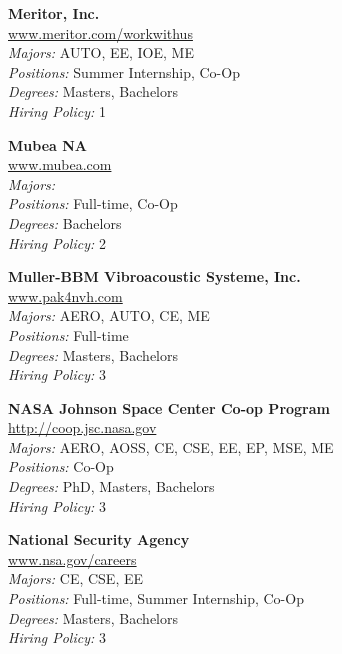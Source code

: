 \documentclass{article}
\begin{document}
\begin{center}
\begin{multicols}{3}
\begin{minipage}{.9\columnwidth}{\Large\bf Meritor, Inc. }\\
	\url{www.meritor.com/workwithus}\\
	\emph{Majors:} AUTO, EE, IOE, ME\\
	\emph{Positions:} Summer Internship, Co-Op\\
	\emph{Degrees:} Masters, Bachelors\\
	\emph{Hiring Policy:} 1\\
\end{minipage}
 
\begin{minipage}{.9\columnwidth}{\Large\bf Mubea NA }\\
	\url{www.mubea.com}\\
	\emph{Majors:} \\
	\emph{Positions:} Full-time, Co-Op\\
	\emph{Degrees:} Bachelors\\
	\emph{Hiring Policy:} 2\\
\end{minipage}
 
\begin{minipage}{.9\columnwidth}{\Large\bf Muller-BBM Vibroacoustic Systeme, Inc. }\\
	\url{www.pak4nvh.com}\\
	\emph{Majors:} AERO, AUTO, CE, ME\\
	\emph{Positions:} Full-time\\
	\emph{Degrees:} Masters, Bachelors\\
	\emph{Hiring Policy:} 3\\
\end{minipage}
 
\begin{minipage}{.9\columnwidth}{\Large\bf NASA Johnson Space Center Co-op Program }\\
	\url{http://coop.jsc.nasa.gov}\\
	\emph{Majors:} AERO, AOSS, CE, CSE, EE, EP, MSE, ME\\
	\emph{Positions:} Co-Op\\
	\emph{Degrees:} PhD, Masters, Bachelors\\
	\emph{Hiring Policy:} 3\\
\end{minipage}
 
\begin{minipage}{.9\columnwidth}{\Large\bf National Security Agency }\\
	\url{www.nsa.gov/careers}\\
	\emph{Majors:} CE, CSE, EE\\
	\emph{Positions:} Full-time, Summer Internship, Co-Op\\
	\emph{Degrees:} Masters, Bachelors\\
	\emph{Hiring Policy:} 3\\
\end{minipage}
 

\end{multicols}
\end{center}
\end{document}
